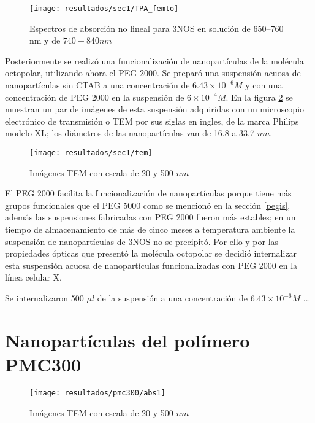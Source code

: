 \begin{figure}[h]
\centering
\texttt{[image: resultados/sec1/TPA\_femto]}
\caption{Espectros de absorci\'on no lineal para 3NOS en soluci\'on de 650--760 nm y de $740-840nm$}\label{valoressigmafs}
\end{figure}

Posteriormente se realiz\'o una funcionalizaci\'on de nanopart\'iculas de la mol\'ecula octopolar, utilizando ahora el PEG 2000. Se prepar\'o una suspensi\'on acuosa de nanopart\'iculas sin CTAB a una concentraci\'on de $6.43 \times 10^{-6} M$ y con una concentraci\'on de PEG 2000 en la suspensi\'on de $6\times 10^{-4} M$. En la figura \ref{temi} se muestran un par de im\'agenes de esta suspensi\'on adquiridas con un microscopio electr\'onico de transmisi\'on o TEM por sus siglas en ingles, de la marca Philips modelo XL; los di\'ametros de las nanopart\'iculas van de 16.8 a 33.7 $nm$. 

\begin{figure}[h]
\centering
\texttt{[image: resultados/sec1/tem]}
\caption{Im\'agenes TEM con escala de 20 y 500 $nm$}\label{temi}
\end{figure}

El PEG 2000 facilita la funcionalizaci\'on de nanopart\'iculas porque tiene m\'as grupos funcionales que el PEG 5000 como se mencion\'o en la secci\'on \ref{pegis}, adem\'as las suspensiones fabricadas con PEG 2000 fueron m\'as estables; en un tiempo de almacenamiento de m\'as de cinco meses a temperatura ambiente la suspensi\'on de nanopart\'iculas de 3NOS no se precipit\'o. Por ello y por las propiedades \'opticas que present\'o la mol\'ecula octopolar se decidi\'o internalizar esta suspensi\'on acuosa de nanopart\'iculas funcionalizadas con PEG 2000 en la l\'inea celular X.

Se internalizaron 500 $\mu l$ de la suspensi\'on a una concentraci\'on de $6.43 \times 10^{-6} M$ ...  


\section{Nanopart\'iculas del pol\'imero PMC300} 


\begin{figure}[H]
\centering
\texttt{[image: resultados/pmc300/abs1]}
\caption{Im\'agenes TEM con escala de 20 y 500 $nm$}\label{pmc_abs1}
\end{figure}
